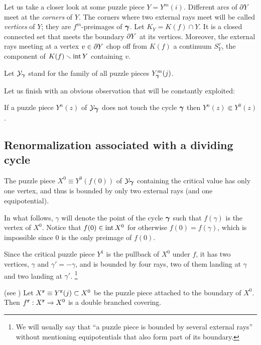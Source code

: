 Let us take a closer look at some puzzle piece $Y=Y^m(i)$.
Different arcs of $\partial Y$  meet at the {\it corners} of $Y$.
The corners where two external rays meet will be called {\it vertices} of $Y$;
they are $f^m$-preimages of ${\mbox{\boldmath$\gamma$} }$.
Let $K_Y= K(f)\cap Y$. It is a closed connected set that meets the boundary $\partial Y$
at its  vertices. Moreover, the external rays meeting at a vertex $v\in \partial Y$ chop off from
$K(f)$ a continuum $S_Y^v$, the component of $K(f)\smallsetminus \operatorname{int} Y$ containing $v$. 

Let ${\mathcal Y}_{\mbox{\scriptsize\boldmath$\gamma$} }$ stand for the family of all puzzle pieces $Y_{\mbox{\scriptsize\boldmath$\gamma$} }^m(j)$. 

Let us finish with an obvious observation that will be constantly exploited:

\begin{lem}\label{Subset}
  If a puzzle piece $Y^n(z)$ of ${\mathcal Y}_{\mbox{\boldmath$\gamma$} }$ does not touch the cycle ${\mbox{\boldmath$\gamma$} }$
then $Y^n(z)\Subset Y^0(z)$.
\end{lem}

\subsection{Renormalization associated with a dividing cycle}\label{renorm-sec}

\begin{lem}\label{cv pp}
  The puzzle piece $X^0 \equiv Y^0(f(0))$ of ${\mathcal Y}_{\mbox{\boldmath$\gamma$} }$ 
containing the critical value has only one vertex, 
and thus is bounded by only two external rays (and one equipotential).
\end{lem} 
  
In what follows, 
$\gamma$ will denote the point of the cycle ${\mbox{\boldmath$\gamma$} }$ such that $f(\gamma)$ is the vertex of $X^0$.
Notice that $f(0)\in \operatorname{int} X^0$ for otherwise $f(0)=f(\gamma)$, which is impossible since $0$ is the
only preimage of $f(0)$. 

Since the critical puzzle piece $Y^1$ is the pullback of $X^0$ under $f$, it has two vertices, 
$\gamma$ and $\gamma'= -\gamma$, and is bounded by four rays,
two of them landing at $\gamma$ and two landing at $\gamma'$.%
\footnote{We will usually say that ``a puzzle piece is bounded by several external rays'' 
without mentioning equipotentials that also form part of its boundary.} 

\begin{lem}(see \cite{D})
  Let $X^{\mathbf{r}} \equiv Y^{\mathbf{r}} (j)\subset X^0$  be the puzzle piece attached to the boundary of $X^0$.
Then $f^{\mathbf{r}} : X^{\mathbf{r}} \rightarrow X^0$ is a double branched covering.
\end{lem}
 
